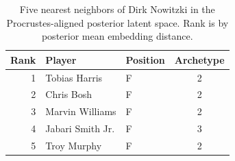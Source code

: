 \begin{table}[htbp]
  \centering\small
  \begin{tabular}{rllc}
    \toprule
    Rank & Player & Position & Archetype \\
    \midrule
    1 & Tobias Harris & F & 2 \\
    2 & Chris Bosh & F & 2 \\
    3 & Marvin Williams & F & 2 \\
    4 & Jabari Smith Jr. & F & 3 \\
    5 & Troy Murphy & F & 2 \\
    \bottomrule
  \end{tabular}
  \caption{Five nearest neighbors of Dirk Nowitzki in the Procrustes-aligned posterior latent space. Rank is by posterior mean embedding distance.}
  \label{tab:Dirk_Nowitzki_neighbors}
\end{table}

